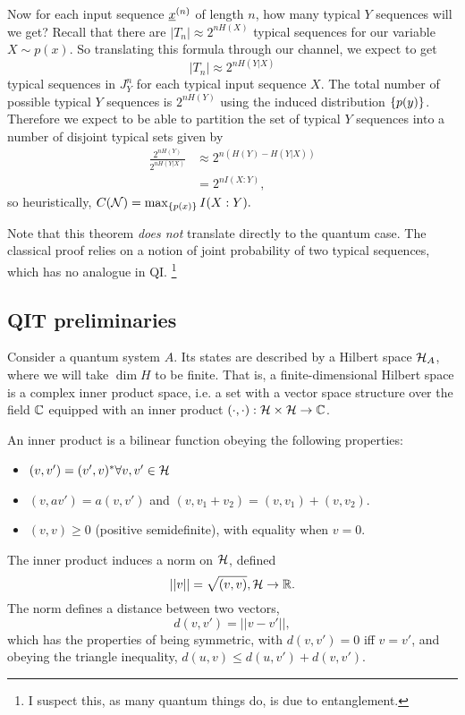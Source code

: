 Now for each input sequence $\underline{x}^{(n)}$ of length $n$, how many typical $Y$ sequences will we get? Recall that there are $|T_n| \approx 2^{nH(X)}$ typical sequences for our variable $X\sim p(x)$. So translating this formula through our channel, we expect to get
\begin{equation}
    |T_n|\approx 2^{nH(Y|X)}
\end{equation}
typical sequences in $J_Y^n$ for each typical input sequence $X$. The total number of possible typical $Y$ sequences is $2^{nH(Y)}$ using the induced distribution $\{p(y)\}$. Therefore we expect to be able to partition the set of typical $Y$ sequences into a number of disjoint typical sets given by
\begin{align}
    \frac{2^{nH(Y)}}{2^{nH(Y|X)}} &\approx 2^{n(H(Y)-H(Y|X))}\\
    &= 2^{nI(X:Y)},
\end{align}
so heuristically, $C(\mathcal{N})=\max_{\{p(x)\}} I(X:Y).$

Note that this theorem \emph{does not} translate directly to the quantum case. The classical proof relies on a notion of joint probability of two typical sequences, which has no analogue in QI.%
    \footnote{I suspect this, as many quantum things do, is due to entanglement.}
    
\subsection*{QIT preliminaries} Consider a quantum system $A$. Its states are described by a Hilbert space $\mathcal H_A$, where we will take $\dim H$ to be finite. That is, a finite-dimensional Hilbert space is a complex inner product space, i.e. a set with a vector space structure over the field $\mathbb{C}$ equipped with an inner product $(\cdot,\cdot):\mathcal H \times \mathcal H \to \mathbb{C}$.

An inner product is a bilinear function obeying the following properties:
\begin{itemize}
    \item $(v,v')=(v',v)^* \forall v,v' \in \mathcal H$
    \item $(v,av')=a(v,v')$ and $(v,v_1+v_2)=(v,v_1)+(v,v_2)$.
    \item $(v,v)\geq 0$  (positive semidefinite), with equality when $v=0.$
\end{itemize}
The inner product induces a norm on $\mathcal H$, defined
\begin{equation}
    ||v||=\sqrt{(v,v)}, \mathcal H \to \mathbb{R}.
\end{equation}
The norm defines a distance between two vectors,
\begin{equation}
    d(v,v')=||v-v'||,
\end{equation}
which has the properties of being symmetric, with $d(v,v')=0$ iff $v=v'$, and obeying the triangle inequality, $d(u,v) \leq d(u,v') + d(v,v').$

